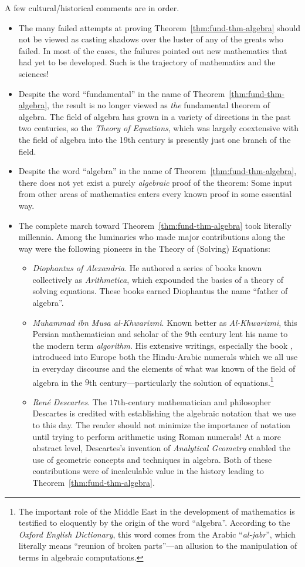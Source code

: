 A few cultural/historical comments are in order.
\begin{itemize}
\item
The many failed attempts at proving Theorem~\ref{thm:fund-thm-algebra} should not be viewed as casting shadows over the luster of any of the greats who failed.  In most of the cases, the failures pointed out new mathematics that had yet to be developed.  Such is the trajectory of mathematics and the sciences!
\item
Despite the word ``fundamental'' in the name of Theorem~\ref{thm:fund-thm-algebra}, the result is no longer viewed as {\em the} fundamental theorem of algebra.  The field of algebra has grown in a variety of directions in the past two centuries, so the {\em Theory of Equations}, which was largely coextensive with the field of algebra into the 19th century is presently just one branch of the field.
\item
Despite the word ``algebra'' in the name of Theorem~\ref{thm:fund-thm-algebra}, there does not yet exist a purely {\em algebraic} proof of the theorem: Some input from other areas of mathematics enters every known proof in some essential way.
\item
The complete march toward Theorem~\ref{thm:fund-thm-algebra} took literally millennia.  Among the luminaries who made major contributions along the way were the following pioneers in the Theory of (Solving) Equations:
  \begin{itemize}
  \item
{\it Diophantus of Alexandria}.  He authored a series of books known collectively as {\it Arithmetica}, which expounded the basics of a theory of solving equations.  These books earned Diophantus the name ``father of algebra''.
   \item
{\it Muhammad ibn Musa al-Khwarizmi}.  Known better as {\em Al-Khwarizmi}, this Persian mathematician and scholar of the $9$th century lent his name to the modern term {\it algorithm}.  His extensive writings, especially the book \cite{Al-Khwarizmi}, introduced into Europe both the Hindu-Arabic numerals which we all use in everyday discourse and the elements of what was known of the field of algebra in the $9$th century---particularly the solution of equations.\footnote{The important role of the Middle East in the development of mathematics is testified to eloquently by the origin of the word ``algebra''.  According to the {\it Oxford English Dictionary}, this word comes from the Arabic ``{\it al-jabr}'', which literally means ``reunion of broken parts''---an allusion to the manipulation of terms in algebraic computations.}
   \item
{\it Ren\'{e} Descartes}.  The $17$th-century mathematician and philosopher Descartes is credited with establishing the algebraic notation that we use to this day.  The reader should not minimize the importance of notation until trying to perform arithmetic using Roman numerals!  At a more abstract level, Descartes's invention of {\em Analytical Geometry} enabled the use of geometric concepts and techniques in algebra.  Both of these contributions were of incalculable value in the history leading to Theorem~\ref{thm:fund-thm-algebra}.
   \end{itemize}
\end{itemize}
